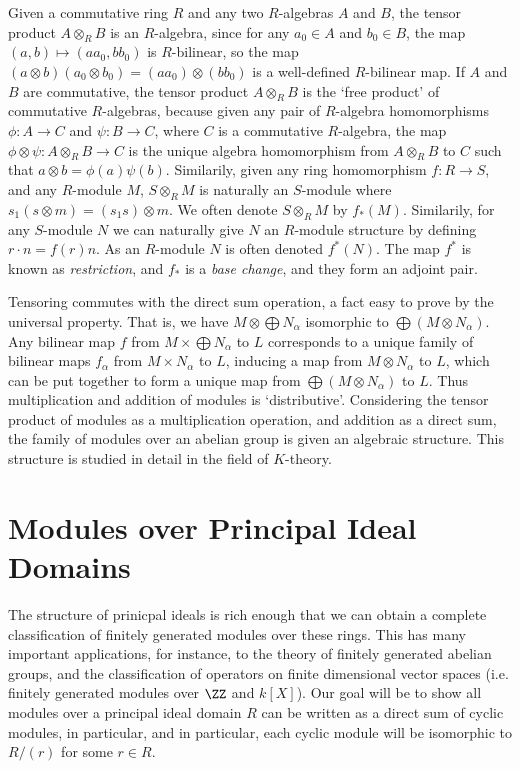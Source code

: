 Given a commutative ring $R$ and any two $R$-algebras $A$ and $B$, the tensor product $A \otimes_R B$ is an $R$-algebra, since for any $a_0 \in A$ and $b_0 \in B$, the map $(a,b) \mapsto (aa_0,bb_0)$ is $R$-bilinear, so the map $(a \otimes b)(a_0 \otimes b_0) = (aa_0) \otimes (bb_0)$ is a well-defined $R$-bilinear map. If $A$ and $B$ are commutative, the tensor product $A \otimes_R B$ is the `free product' of commutative $R$-algebras, because given any pair of $R$-algebra homomorphisms $\phi: A \to C$ and $\psi: B \to C$, where $C$ is a commutative $R$-algebra, the map $\phi \otimes \psi: A \otimes_R B \to C$ is the unique algebra homomorphism from $A \otimes_R B$ to $C$ such that $a \otimes b = \phi(a) \psi(b)$. Similarily, given any ring homomorphism $f: R \to S$, and any $R$-module $M$, $S \otimes_R M$ is naturally an $S$-module where $s_1 (s \otimes m) = (s_1s) \otimes m$. We often denote $S \otimes_R M$ by $f_*(M)$. Similarily, for any $S$-module $N$ we can naturally give $N$ an $R$-module structure by defining $r \cdot n = f(r)n$. As an $R$-module $N$ is often denoted $f^*(N)$. The map $f^*$ is known as \emph{restriction}, and $f_*$ is a \emph{base change}, and they form an adjoint pair.

Tensoring commutes with the direct sum operation, a fact easy to prove by the universal property. That is, we have $M \otimes \bigoplus N_\alpha$ isomorphic to $\bigoplus (M \otimes N_\alpha)$. Any bilinear map $f$ from $M \times \bigoplus N_\alpha$ to $L$ corresponds to a unique family of bilinear maps $f_\alpha$ from $M \times N_\alpha$ to $L$, inducing a map from $M \otimes N_\alpha$ to $L$, which can be put together to form a unique map from $\bigoplus (M \otimes N_\alpha)$ to $L$. Thus multiplication and addition of modules is `distributive'. Considering the tensor product of modules as a multiplication operation, and addition as a direct sum, the family of modules over an abelian group is given an algebraic structure. This structure is studied in detail in the field of $K$-theory.


\section{Modules over Principal Ideal Domains}

The structure of prinicpal ideals is rich enough that we can obtain a complete classification of finitely generated modules over these rings. This has many important applications, for instance, to the theory of finitely generated abelian groups, and the classification of operators on finite dimensional vector spaces (i.e. finitely generated modules over $\ZZ$ and $k[X]$). Our goal will be to show all modules over a principal ideal domain $R$ can be written as a direct sum of cyclic modules, in particular, and in particular, each cyclic module will be isomorphic to $R/(r)$ for some $r \in R$.

